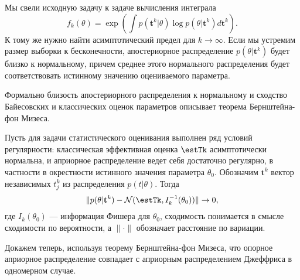 Мы свели исходную задачу к задаче вычисления интеграла 
\[
f_k(\theta) = \exp \left(\int p(\mathbf{t}^k | \theta) \log p(\theta | \mathbf{t}^k) d \mathbf{t}^k \right).
\]
К тому же нужно найти асимптотический предел для $k \rightarrow \infty$.
Если мы устремим размер выборки к бесконечности,
апостериорное распределение $p(\theta| \mathbf{t}^k) $ будет близко к нормальному,
причем среднее этого нормального распределения будет соответствовать 
истинному значению оцениваемого параметра.

Формально близость апостериорного распределения к нормальному и 
сходство Байесовских и классических оценок параметров
описывает теорема Бернштейна-фон Мизеса.

\begin{Theorem}
Пусть для задачи статистического оценивания выполнен ряд условий регулярности: классическая эффективная оценка $\estTk$ асимптотически нормальна, и априорное распределение ведет себя достаточно регулярно, в частности в окрестности истинного значения параметра $\theta_0$.
Обозначим $\mathbf{t}^k$ вектор независимых $t^k_j$ из распределения $p(t| \theta)$. Тогда
\begin{equation}
\label{eq:bvm}
\|p(\theta | \mathbf{t}^k) - \mathcal{N}(\estTk, I_k^{-1}(\theta_0))\| \rightarrow 0,
\end{equation}
где $I_k(\theta_0)$ --- информация Фишера для $\theta_0$, сходимость понимается в смысле сходимости по вероятности, а $\|\cdot\|$ обозначает расстояние по вариации.
\end{Theorem}

Докажем теперь, используя теорему Бернштейна-фон Мизеса, что опорное априорное распределение совпадает с априорным распределением Джеффриса в одномерном случае.

